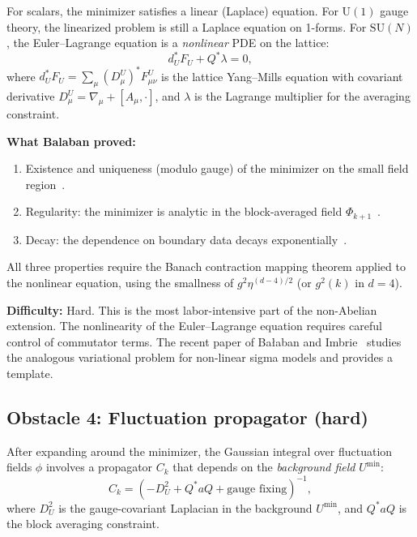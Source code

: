 \documentclass[11pt,a4paper]{article}
\theoremstyle{plain}
\theoremstyle{definition}
\theoremstyle{remark}
\newcommand{\SU}{\mathrm{SU}}
\newcommand{\U}{\mathrm{U}}
\begin{document}
For scalars, the minimizer satisfies a linear
(Laplace) equation. For $\U(1)$ gauge theory,
the linearized problem is still a Laplace equation
on 1-forms. For $\SU(N)$, the Euler--Lagrange
equation is a \emph{nonlinear} PDE on the lattice:
\begin{equation}\label{eq:euler_lagrange}
  d_U^* F_U + Q^* \lambda = 0,
\end{equation}
where $d_U^* F_U = \sum_\mu (D_\mu^{U})^* F_{\mu\nu}^U$
is the lattice Yang--Mills equation with covariant derivative
$D_\mu^U = \nabla_\mu + [A_\mu, \cdot]$, and $\lambda$
is the Lagrange multiplier for the averaging constraint.

\textbf{What Balaban proved:}
\begin{enumerate}[label=(\alph*)]
  \item Existence and uniqueness (modulo gauge) of the
    minimizer on the small field region~\cite{Bal85d}.
  \item Regularity: the minimizer is analytic in the
    block-averaged field $\Phi_{k+1}$~\cite{Bal85d}.
  \item Decay: the dependence on boundary data
    decays exponentially~\cite{Bal85d}.
\end{enumerate}
All three properties require the Banach contraction
mapping theorem applied to the nonlinear equation,
using the smallness of $g^2 \eta^{(d-4)/2}$ (or
$g^2(k)$ in $d=4$).

\textbf{Difficulty:} Hard. This is the most labor-intensive
part of the non-Abelian extension. The nonlinearity of
the Euler--Lagrange equation requires careful control
of commutator terms. The recent paper of
Bałaban and Imbrie~\cite{BI_sigma} studies the
analogous variational problem for non-linear sigma models
and provides a template.

\subsection{Obstacle 4: Fluctuation propagator (hard)}

After expanding around the minimizer, the Gaussian
integral over fluctuation fields $\phi$ involves a
propagator $C_k$ that depends on the \emph{background
field} $U^{\min}$:
\begin{equation}\label{eq:propagator}
  C_k = \left(-D_U^2 + Q^* a Q + \text{gauge fixing}
  \right)^{-1},
\end{equation}
where $D_U^2$ is the gauge-covariant Laplacian in
the background $U^{\min}$, and $Q^* a Q$ is the
block averaging constraint.
\end{document}
